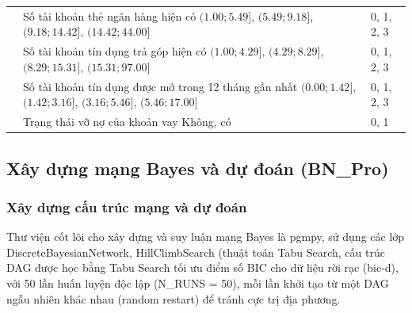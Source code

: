 \begin{longtable}{V{2.6cm}D{9.0cm}S{3.0cm}}
     & Số tài khoản thẻ ngân hàng hiện có \newline $(1.00; 5.49]$, $(5.49; 9.18]$, $(9.18; 14.42]$, $(14.42; 44.00]$ & 0, 1, 2, 3 \\
 
     & Số tài khoản tín dụng trả góp hiện có \newline $(1.00; 4.29]$, $(4.29; 8.29]$, $(8.29; 15.31]$, $(15.31; 97.00]$ & 0, 1, 2, 3 \\
 
     & Số tài khoản tín dụng được mở trong 12 tháng gần nhất \newline $(0.00; 1.42]$, $(1.42; 3.16]$, $(3.16; 5.46]$, $(5.46; 17.00]$ & 0, 1, 2, 3 \\
 
     & Trạng thái vỡ nợ của khoản vay \newline Không, có & 0, 1 \\
 
\end{longtable}

\subsection{Xây dựng mạng Bayes và dự đoán (BN\_Pro)}
\subsubsection{Xây dựng cấu trúc mạng và dự đoán}
\label{sec: 4.3.1}
\noindent
Thư viện cốt lõi cho xây dựng và suy luận mạng Bayes là pgmpy, sử dụng các lớp DiscreteBayesianNetwork, HillClimbSearch (thuật toán Tabu Search, cấu trúc DAG được học bằng Tabu Search tối ưu điểm số BIC cho dữ liệu rời rạc (bic-d), với 50 lần huấn luyện độc lập (N\_RUNS = 50), mỗi lần khởi tạo từ một DAG ngẫu nhiên khác nhau (random restart) để tránh cực trị địa phương.

